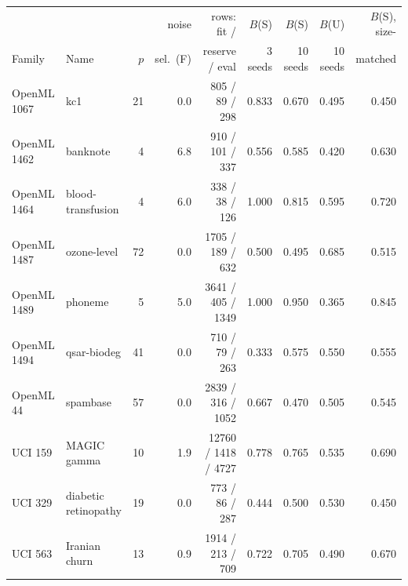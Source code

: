 \begin{tabular}{llrrrrrrr}\toprule
 & & & noise & rows: fit / & $B$(S) & $B$(S) & $B$(U) & $B$(S), size-\\
Family & Name & $p$ & sel.\ (F) & reserve / eval & 3 seeds & 10 seeds & 10 seeds & matched\\\midrule
OpenML 1067 & kc1 & 21 & 0.0 & 805 / 89 / 298 & 0.833 & 0.670 & 0.495 & 0.450\\
OpenML 1462 & banknote & 4 & 6.8 & 910 / 101 / 337 & 0.556 & 0.585 & 0.420 & 0.630\\
OpenML 1464 & blood-transfusion & 4 & 6.0 & 338 / 38 / 126 & 1.000 & 0.815 & 0.595 & 0.720\\
OpenML 1487 & ozone-level & 72 & 0.0 & 1705 / 189 / 632 & 0.500 & 0.495 & 0.685 & 0.515\\
OpenML 1489 & phoneme & 5 & 5.0 & 3641 / 405 / 1349 & 1.000 & 0.950 & 0.365 & 0.845\\
OpenML 1494 & qsar-biodeg & 41 & 0.0 & 710 / 79 / 263 & 0.333 & 0.575 & 0.550 & 0.555\\
OpenML 44 & spambase & 57 & 0.0 & 2839 / 316 / 1052 & 0.667 & 0.470 & 0.505 & 0.545\\
UCI 159 & MAGIC gamma & 10 & 1.9 & 12760 / 1418 / 4727 & 0.778 & 0.765 & 0.535 & 0.690\\
UCI 329 & diabetic retinopathy & 19 & 0.0 & 773 / 86 / 287 & 0.444 & 0.500 & 0.530 & 0.450\\
UCI 563 & Iranian churn & 13 & 0.9 & 1914 / 213 / 709 & 0.722 & 0.705 & 0.490 & 0.670\\
\bottomrule\end{tabular}
